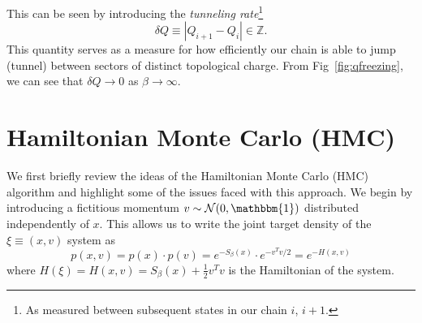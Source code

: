 \documentclass[a4paper,11pt]{article}
\begin{document}
This can be seen by introducing the \emph{tunneling rate}\footnote{As measured
between subsequent states in our chain \(i\), \(i+1\).}
%
\begin{equation}
    \delta Q \equiv \left|Q_{i+1} - Q_{i}\right| \in \mathbb{Z}.
\end{equation}
%
This quantity serves as a measure for how efficiently our chain is able to jump
(tunnel) between sectors of distinct topological charge.
%
From Fig~\ref{fig:qfreezing}, we can see that \(\delta Q\rightarrow 0\) as
\(\beta\rightarrow \infty\).
%
\section{\label{sec:hmc}Hamiltonian Monte Carlo (HMC)}
%
We first briefly review the ideas of the Hamiltonian Monte Carlo (HMC)
algorithm and highlight some of the issues faced with this approach.
%
We begin by introducing a fictitious momentum \(v \sim \mathcal{N}(0,
\mathbbm{1})\) distributed independently of \(x\).
%
This allows us to write the joint target density of the \(\xi \equiv (x, v)\)
system as
%
\begin{equation}
    p(x, v) = p(x) \cdot p(v) = e^{-S_{\beta}(x)}\cdot e^{-v^{T} v / 2} = e^{-H(x, v)}
\end{equation}
%
where \(H(\xi) = H(x, v) = S_{\beta}(x) + \frac{1}{2} v^{T} v\) is the
Hamiltonian of the system.
%
\end{document}
